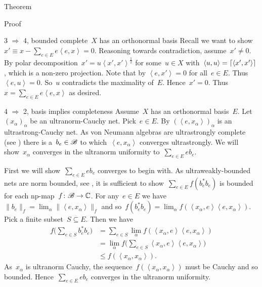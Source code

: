 \documentclass[b]{subfiles}
\begin{document}
\begin{parsec}
\begin{point}{Theorem}
\begin{point}{Proof}
\begin{point}{3
    $\Rightarrow$ 4, bounded complete~$X$ has an orthonormal basis}
Recall we want to
show~$x' \equiv x - \sum_{e \in E} e\left<e,x\right>= 0$.
Reasoning towards contradiction, assume~$x' \neq 0$.
By polar decomposition~$x' = u\left<x',x'\right>^{\frac{1}{2}}$
for some~$u \in X$ with~$\left<u,u\right> = \left\lceil\left<x',x'\right>\right\rceil$,
which is a non-zero projection.
Note that by \TODO{} $\left<e,x'\right> =0$
for all~$e \in E$.
Thus~\TODO{} $\left<e,u\right> = 0$.
So~$u$ contradicts the maximality of~$E$.
Hence~$x'=0$. Thus~$x = \sum_{e \in E} e\left<e,x\right>$ as desired.
\end{point}
\begin{point}{4 $\Rightarrow$ 2, basis implies completeness}%
    Assume~$X$ has an orthonormal basis~$E$.
    Let~$(x_\alpha)_\alpha$ be an ultranorm-Cauchy net.
    Pick~$e \in E$.
    By 
    $(\left<e, x_\alpha\right>)_\alpha$ is an ultrastrong-Cauchy net.
    As von Neumann algebras are ultrastrongly complete
    (see )
        there is a~$b_e \in \mathscr{B}$
            to which~$\left<e,x_\alpha\right>$ converges ultrastrongly.
    We will show~$x_\alpha$ converges in the ultranorm uniformity
        to~$\sum_{e \in E} e b_e$.

    First we will show~$\sum_{e \in E} e b_e$ converges to
        begin with.
    As ultraweakly-bounded nets are norm bounded,
    see ,
        it is sufficient to show~$\sum_{e\in E} f( b_e^*b_e ) $ is bounded
        for each np-map~$f\colon \mathscr{B} \to \mathbb{C}$.
    For any~$e \in E$
    we have~$\|b_e\|_f = \lim_\alpha \|\left<e,x_\alpha\right>\|_f$
    and so~$f(b_e^*b_e) =\lim_\alpha f(\left<x_\alpha,e\right> \left<e, x_\alpha\right>)$.
    Pick a finite subset~$S \subseteq E$. Then we have
 \begin{align*}
    f\bigl(\sum_{e \in S} b_e^*b_e\bigr)
    &= \sum_{e \in S} \lim_\alpha 
     f(\left<x_\alpha,e\right> \left<e, x_\alpha\right>) \\
     & = \lim_\alpha 
            f\bigl(\sum_{e \in S}\left<x_\alpha,e\right>
                \left<e, x_\alpha\right>\bigr) \\
            &\leq f(\left<x_\alpha,x_\alpha\right>).
 \end{align*}
As~$x_\alpha$ is ultranorm Cauchy,
the sequence~$f(\left<x_\alpha,x_\alpha\right>)$
    must be Cauchy and so bounded.
Hence~$\sum_{e \in E} e b_e$ converges in the ultranorm uniformity.


\end{point}
\end{point}
\end{point}
\end{parsec}
\end{document}
